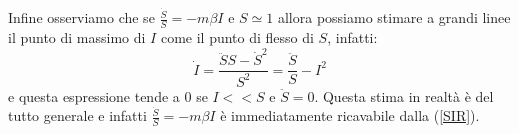 Infine osserviamo che se $\frac{\dot{S}}{S}=-m\beta I$ e $S\simeq 1$ allora possiamo stimare a grandi linee il punto di massimo di $I$ come il punto di flesso di $S$, infatti:
\begin{equation}
	\dot{I}=\frac{\ddot{S}S-\dot{S}^2}{S^2}=\frac{\ddot{S}}{S}-I^2
\end{equation}
e questa espressione tende a $0$ se $I<<S$ e $\ddot{S}=0$. Questa stima in realtà è del tutto generale e infatti $\frac{\dot{S}}{S}=-m\beta I$ è immediatamente ricavabile dalla (\ref{SIR}).